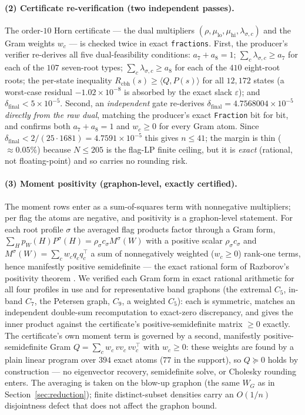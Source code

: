 \documentclass[11pt]{article}
\theoremstyle{remark}
\begin{document}
\paragraph{(2) Certificate re-verification (two independent passes).} The order-$10$
Horn certificate --- the dual multipliers $(\rho,\mu_{\mathrm{lo}},\mu_{\mathrm{hi}},
\lambda_{\sigma,c})$ and the Gram weights $w_c$ --- is checked twice in exact
\texttt{fractions}. First, the producer's verifier re-derives all five
dual-feasibility conditions: $a_7+a_8=1$; $\sum_c\lambda_{\sigma,c}\ge a_7$ for each
of the $107$ seven-root types; $\sum_c\lambda_{\sigma,c}\ge a_8$ for each of the $410$
eight-root roots; the per-state inequality $R_{\mathrm{cbh}}(s)\ge\langle Q,P(s)\rangle$
for all $12{,}172$ states (a worst-case residual $-1.02\times10^{-8}$ is absorbed by
the exact slack $\varepsilon$); and $\delta_{\mathrm{final}}<5\times10^{-5}$. Second,
an \emph{independent} gate re-derives
$\delta_{\mathrm{final}}=4.7568004\times10^{-5}$ \emph{directly from the raw dual},
matching the producer's exact \texttt{Fraction} bit for bit, and confirms both
$a_7+a_8=1$ and $w_c\ge0$ for every Gram atom. Since
$\delta_{\mathrm{final}}<2/(25\cdot 1681)=4.7591\times10^{-5}$ this gives $n\le 41$;
the margin is thin ($\approx0.05\%$) because $N\le 205$ is the flag-LP finite ceiling,
but it is \emph{exact} (rational, not floating-point) and so carries no rounding risk.

\paragraph{(3) Moment positivity (graphon-level, exactly certified).} The moment
rows enter as a sum-of-squares term with nonnegative multipliers; per flag the
atoms are negative, and positivity is a graphon-level statement. For each root
profile $\sigma$ the averaged flag products factor through a Gram form,
$\sum_H p_W(H)P^\sigma(H)=\rho_\sigma c_\sigma M^\sigma(W)$ with a positive scalar
$\rho_\sigma c_\sigma$ and $M^\sigma(W)=\sum_c w_c q_c q_c^\top$ a sum of
nonnegatively weighted ($w_c\ge0$) rank-one terms, hence manifestly positive
semidefinite --- the exact rational form of Razborov's positivity theorem
\cite{Raz07}. We verified each Gram form in exact rational arithmetic for all four
profiles in use and for representative band graphons (the extremal $C_5$, in-band
$C_7$, the Petersen graph, $C_9$, a weighted $C_5$): each is symmetric, matches an
independent double-sum recomputation to exact-zero discrepancy, and gives the
inner product against the certificate's positive-semidefinite matrix
$\ge 0$ exactly. The certificate's own moment term is governed by a second,
manifestly positive-semidefinite Gram $Q=\sum_c w_c\,vv_c\,vv_c^\top$ with $w_c\ge0$:
these weights are found by a plain linear program over $394$ exact atoms ($77$ in the
support), so $Q\succeq0$ holds by construction --- no eigenvector recovery,
semidefinite solve, or Cholesky rounding enters. The averaging is taken on the
blow-up graphon (the same $W_G$ as in Section~\ref{sec:reduction}); finite
distinct-subset densities carry an $O(1/n)$ disjointness defect that does not affect
the graphon bound.
\end{document}
